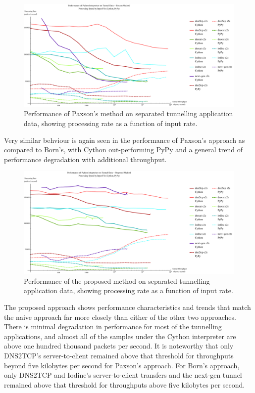 \documentclass[12pt]{report}
\theoremstyle{remark}
\theoremstyle{definition}
\theoremstyle{definition}
\theoremstyle{definition}
\begin{document}
\begin{figure}
\centering
\includegraphics[width=\textwidth]{figures/ppia-paxson.pdf}
\caption[Performance of Paxson's Method on Tunnel Data by Python
Interpreter]{Performance of Paxson's method on separated tunnelling application
data, showing processing rate as a function of input rate.}
\label{ppia-paxson}
\end{figure}

Very similar behviour is again seen in the performance of Paxson's approach as
compared to Born's, with Cython out-performing PyPy and a general
trend of performance degradation with additional throughput.

\begin{figure}
\centering
\includegraphics[width=\textwidth]{figures/ppia-proposed.pdf}
\caption[Performance of the Proposed Method on Tunnel Data by Python
Interpreter]{Performance of the proposed method on separated tunnelling
application data, showing processing rate as a function of input rate.}
\label{ppia-proposed}
\end{figure}

The proposed approach shows performance characteristics and trends that match
the naive approach far more closely than either of the other two approaches.
There is minimal degradation in performance for most of the tunnelling
applications, and almost all of the samples under the Cython interpreter are
above one hundred thousand packets per second. It is noteworthy that only
DNS2TCP's server-to-client remained above that threshold for throughputs beyond
five kilobytes per second for Paxson's approach. For Born's approach, only
DNS2TCP and Iodine's server-to-client transfers and the next-gen tunnel remained
above that threshold for throughputs above five kilobytes per second.
\end{document}
